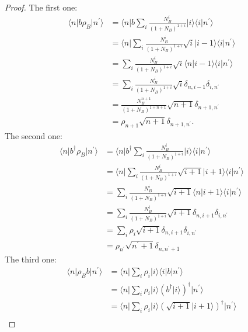 \documentclass[../../note.tex]{subfiles}
\begin{document}
\begin{proof}
    The first one:
    \begin{align}
        \langle n \vert b \rho_B \vert n^\prime \rangle 
        &= \langle n \vert b \sum_i \frac{N_B^i}{(1 + N_B)^{1+i}} \vert i \rangle \langle i \vert n^\prime \rangle \\
        &= \langle n \vert \sum_i \frac{N_B^i}{(1+N_B)^{1+i}} \sqrt{i} \vert i-1 \rangle \langle i \vert n^\prime \rangle \\
        &= \sum_i \frac{N_B^i}{(1 + N_B)^{1+i}} \sqrt{i} \langle n \vert i-1 \rangle \langle i \vert n^\prime \rangle \\
        &= \sum_i \frac{N_B^i}{(1 + N_B)^{1+i}} \sqrt{i} \delta_{n, i-1} \delta_{i, n^\prime} \\
        &= \frac{N_B^{n+1}}{(1 + N_B)^{1 + n+1}} \sqrt{n+1} \delta_{n+1, n^\prime} \\
        &= \rho_{n+1} \sqrt{n+1} \delta_{n+1, n^\prime}.
    \end{align}
    The second one:
    \begin{align}
        \langle n \vert b^\dagger \rho_B \vert n^\prime \rangle 
        &= \langle n \vert b^\dagger \sum_i \frac{N_B^i}{(1 + N_B)^{1+i}} \vert i \rangle \langle i \vert n^\prime \rangle \\
        &= \langle n \vert \sum_i \frac{N_B^i}{(1+N_B)^{1+i}} \sqrt{i+1} \vert i+1 \rangle \langle i \vert n^\prime \rangle \\
        &= \sum_i \frac{N_B^i}{(1 + N_B)^{1+i}} \sqrt{i+1} \langle n \vert i+1 \rangle \langle i \vert n^\prime \rangle \\
        &= \sum_i \frac{N_B^i}{(1 + N_B)^{1+i}} \sqrt{i+1} \delta_{n, i+1} \delta_{i, n^\prime} \\
        &= \sum_i \rho_i \sqrt{i+1} \delta_{n, i+1} \delta_{i, n^\prime} \\
        &= \rho_{n^\prime} \sqrt{n^\prime + 1} \delta_{n, n^\prime + 1}
    \end{align}
    The third one:
    \begin{align}
        \langle n \vert \rho_B b \vert n^\prime \rangle 
        &= \langle n \vert \sum_i \rho_i \vert i \rangle \langle i \vert b \vert n^\prime \rangle \\
        &= \langle n \vert \sum_i \rho_i \vert i \rangle (b^\dagger \vert i \rangle)^\dagger \vert n^\prime \rangle \\
        &= \langle n \vert \sum_i \rho_i \vert i \rangle (\sqrt{i+1} \vert i + 1\rangle)^\dagger \vert n^\prime \rangle \\

\end{align}
\end{proof}
\end{document}
